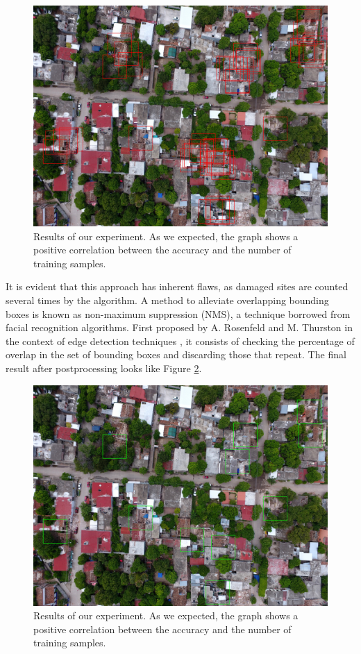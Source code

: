 \begin{figure}[!h]
  \centering
  \includegraphics[width=\textwidth]{images/overlap.jpg}
  \caption{Results of our experiment. As we expected, the graph shows a positive correlation between the accuracy and the number of training samples.}
  \label{fig:overlap}
\end{figure}




It is evident that this approach has inherent flaws, as damaged sites are counted several times by the algorithm. A method to alleviate overlapping bounding boxes is known as non-maximum suppression (NMS), a technique borrowed from facial recognition algorithms. First proposed by A. Rosenfeld and M. Thurston in the context of edge detection techniques \cite{1671883}, it consists of checking the percentage of overlap in the set of bounding boxes and discarding those that repeat. The final result after postprocessing looks like Figure \ref{fig:nooverlap}.\\


\begin{figure}[!h]
  \centering
  \includegraphics[width=\textwidth]{images/no-overlap.jpg}
  \caption{Results of our experiment. As we expected, the graph shows a positive correlation between the accuracy and the number of training samples.}
  \label{fig:nooverlap}
\end{figure}


